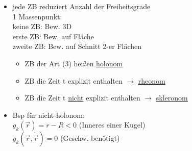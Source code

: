 \documentclass[titlepage,12pt,a4paper,ngerman]{report}
\begin{document}
{\begin{itemize}
	Bsp: $ f=3 $\\
	$ g_\alpha(x,y,z,t) = y = 0 $\\
	$ g_\alpha(x,y,z,t) = x^2 + z^2 - l^2 = 0 $
	\item jede ZB reduziert Anzahl der Freiheitsgrade\\
	1 Massenpunkt:\\
	keine ZB: Bew. 3D\\
	erste ZB: Bew. auf Fläche\\
	zweite ZB: Bew. auf Schnitt 2-er Flächen
	\begin{itemize}
		\item ZB der Art (3) heißen \underline{holonom}
		\item ZB die Zeit t explizit enthalten $ \rightarrow $ \underline{rheonom}
		\item ZB die Zeit t \underline{nicht} explizit enthalten $ \rightarrow $ \underline{skleronom}
	\end{itemize}
	\item Bsp für nicht-holonom:\\
	$ g_k (\vec{r}) = r-R < 0 $ (Inneres einer Kugel)\\
	$ g_k(\vec{r},\dot{\vec{r}})  = 0 $ (Geschw. benötigt)
\end{itemize}
}
\end{document}
